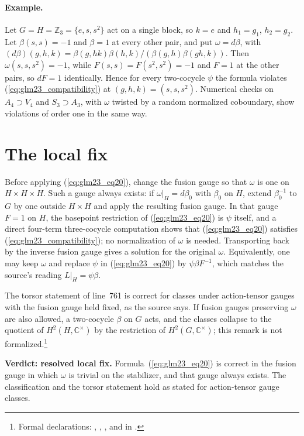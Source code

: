 \documentclass{article}
\begin{document}
\paragraph{Example.} Let $G=H=\mathbb Z_3=\{e,s,s^2\}$ act on a single
block, so $k=e$ and $h_1=g_1$, $h_2=g_2$. Let $\beta(s,s)=-1$ and
$\beta=1$ at every other pair, and put $\omega=d\beta$, with
$(d\beta)(g,h,k)=\beta(g,hk)\beta(h,k)/(\beta(g,h)\beta(gh,k))$. Then
$\omega(s,s,s^2)=-1$, while $F(s,s)=F(s^2,s^2)=-1$ and $F=1$ at the other
pairs, so $dF=1$ identically. Hence for every two-cocycle $\psi$ the
formula violates (\ref{eq:glm23_compatibility}) at $(g,h,k)=(s,s,s^2)$.
Numerical checks on $A_4\supset V_4$ and $S_3\supset A_3$, with $\omega$
twisted by a random normalized coboundary, show violations of order one in
the same way.

\section{The local fix}

Before applying (\ref{eq:glm23_eq20}), change the fusion gauge so that
$\omega$ is one on $H\times H\times H$. Such a gauge always exists: if
$\omega|_H=d\beta_0$ with $\beta_0$ on $H$, extend $\beta_0^{-1}$ to $G$ by
one outside $H\times H$ and apply the resulting fusion gauge. In that gauge
$F=1$ on $H$, the basepoint restriction of (\ref{eq:glm23_eq20}) is $\psi$
itself, and a direct four-term three-cocycle computation shows that
(\ref{eq:glm23_eq20}) satisfies (\ref{eq:glm23_compatibility}); no
normalization of $\omega$ is needed. Transporting back by the inverse
fusion gauge gives a solution for the original $\omega$. Equivalently, one
may keep $\omega$ and replace $\psi$ in (\ref{eq:glm23_eq20}) by
$\psi\beta F^{-1}$, which matches the source's reading $L|_H=\psi\beta$.

The torsor statement of line~761 is correct for classes under
action-tensor gauges with the fusion gauge held fixed, as the source says.
If fusion gauges preserving $\omega$ are also allowed, a two-cocycle $\beta$
on $G$ acts, and the classes collapse to the quotient of
$H^2(H,\mathbb C^\times)$ by the restriction of
$H^2(G,\mathbb C^\times)$; this remark is not formalized.\footnote{Formal declarations:
,
,
,
 and
in .}

\textbf{Verdict: resolved local fix.} Formula~(\ref{eq:glm23_eq20}) is
correct in the fusion gauge in which $\omega$ is trivial on the stabilizer,
and that gauge always exists. The classification and the torsor statement
hold as stated for action-tensor gauge classes.



\end{document}
